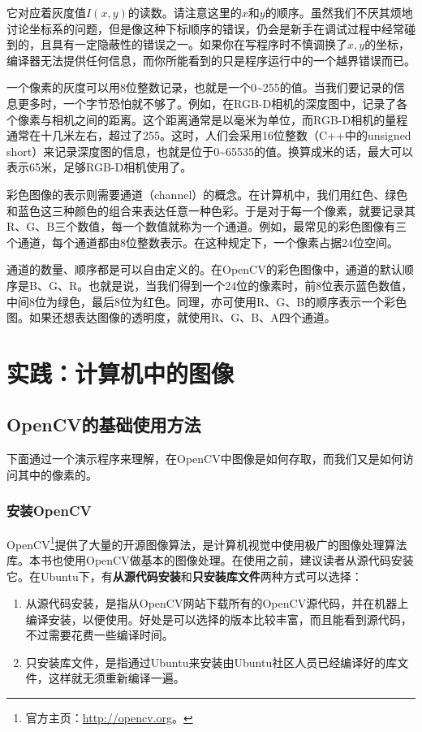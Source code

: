 它对应着灰度值$I(x,y)$的读数。请注意这里的$x$和$y$的顺序。虽然我们不厌其烦地讨论坐标系的问题，但是像这种下标顺序的错误，仍会是新手在调试过程中经常碰到的，且具有一定隐蔽性的错误之一。如果你在写程序时不慎调换了$x,y$的坐标，编译器无法提供任何信息，而你所能看到的只是程序运行中的一个越界错误而已。

一个像素的灰度可以用8位整数记录，也就是一个0\textasciitilde255的值。当我们要记录的信息更多时，一个字节恐怕就不够了。例如，在RGB-D相机的深度图中，记录了各个像素与相机之间的距离。这个距离通常是以毫米为单位，而RGB-D相机的量程通常在十几米左右，超过了255。这时，人们会采用16位整数（C++中的unsigned short）来记录深度图的信息，也就是位于0\textasciitilde65535的值。换算成米的话，最大可以表示65米，足够RGB-D相机使用了。

彩色图像的表示则需要通道（channel）的概念。在计算机中，我们用红色、绿色和蓝色这三种颜色的组合来表达任意一种色彩。于是对于每一个像素，就要记录其R、G、B三个数值，每一个数值就称为一个通道。例如，最常见的彩色图像有三个通道，每个通道都由8位整数表示。在这种规定下，一个像素占据24位空间。

通道的数量、顺序都是可以自由定义的。在OpenCV的彩色图像中，通道的默认顺序是B、G、R。也就是说，当我们得到一个24位的像素时，前8位表示蓝色数值，中间8位为绿色，最后8位为红色。同理，亦可使用R、G、B的顺序表示一个彩色图。如果还想表达图像的透明度，就使用R、G、B、A四个通道。

\section{实践：计算机中的图像}
\subsection{OpenCV的基础使用方法}
下面通过一个演示程序来理解，在OpenCV中图像是如何存取，而我们又是如何访问其中的像素的。

\subsubsection{安装OpenCV}
OpenCV\footnote{官方主页：\url{http://opencv.org}。}提供了大量的开源图像算法，是计算机视觉中使用极广的图像处理算法库。本书也使用OpenCV做基本的图像处理。在使用之前，建议读者从源代码安装它。在Ubuntu下，有\textbf{从源代码安装}和\textbf{只安装库文件}两种方式可以选择：

\begin{enumerate}
	\item 从源代码安装，是指从OpenCV网站下载所有的OpenCV源代码，并在机器上编译安装，以便使用。好处是可以选择的版本比较丰富，而且能看到源代码，不过需要花费一些编译时间。
	\item 只安装库文件，是指通过Ubuntu来安装由Ubuntu社区人员已经编译好的库文件，这样就无须重新编译一遍。
\end{enumerate}

